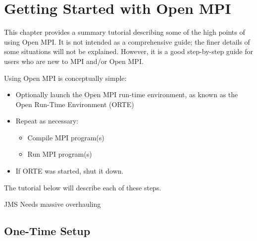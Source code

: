 %
% 
% 
%

\chapter{Getting Started with Open MPI}
\label{sec:getting-started}

This chapter provides a summary tutorial describing some of the high
points of using Open MPI.  It is not intended as a comprehensive
guide; the finer details of some situations will not be explained.
However, it is a good step-by-step guide for users who are new to MPI
and/or Open MPI.

Using Open MPI is conceptually simple:

\begin{itemize}
\item Optionally launch the Open MPI run-time environment, as known as
  the Open Run-Time Environment (ORTE)
\item Repeat as necessary:
  \begin{itemize}
  \item Compile MPI program(s)
  \item Run MPI program(s)
  \end{itemize}
\item If ORTE was started, shut it down.
\end{itemize}

The tutorial below will describe each of these steps.  

{\Huge JMS Needs massive overhauling}


\section{One-Time Setup}

